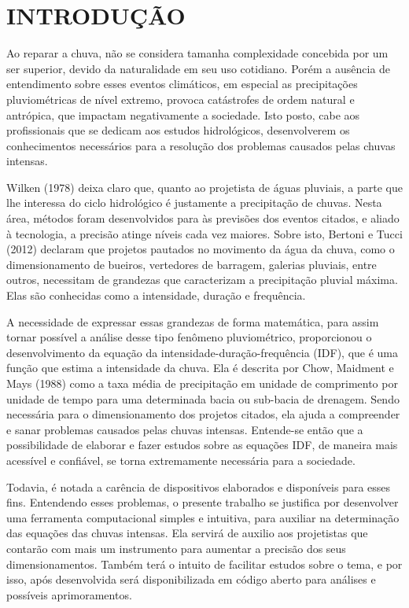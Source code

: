 \onehalfspacing
\chapter{INTRODUÇÃO}

Ao reparar a chuva, não se considera tamanha complexidade concebida por um ser superior, devido da naturalidade em seu uso cotidiano. Porém a ausência de entendimento sobre esses eventos climáticos, em especial as precipitações pluviométricas de nível extremo, provoca catástrofes de ordem natural e antrópica, que impactam negativamente a sociedade. Isto posto, cabe aos profissionais que se dedicam aos estudos hidrológicos, desenvolverem os conhecimentos necessários para a resolução dos problemas causados pelas chuvas intensas.

Wilken (1978) deixa claro que, quanto ao projetista de águas pluviais, a parte que lhe interessa do ciclo hidrológico é justamente a precipitação de chuvas. Nesta área, métodos foram desenvolvidos para às previsões dos eventos citados, e aliado à tecnologia, a precisão atinge níveis cada vez maiores. Sobre isto, Bertoni e Tucci (2012) declaram que projetos pautados no movimento da água da chuva, como o dimensionamento de bueiros, vertedores de barragem, galerias pluviais, entre outros, necessitam de grandezas que caracterizam a precipitação pluvial máxima. Elas são conhecidas como a intensidade, duração e frequência.

A necessidade de expressar essas grandezas de forma matemática, para assim tornar possível a análise desse tipo fenômeno pluviométrico, proporcionou o desenvolvimento da equação da intensidade-duração-frequência (IDF), que é uma função que estima a intensidade da chuva. Ela é descrita por Chow, Maidment e Mays (1988) como a taxa média de precipitação em unidade de comprimento por unidade de tempo para uma determinada bacia ou sub-bacia de drenagem. Sendo necessária para o dimensionamento dos projetos citados, ela ajuda a compreender e sanar problemas causados pelas chuvas intensas. Entende-se então que a possibilidade de elaborar e fazer estudos sobre as equações IDF, de maneira mais acessível e confiável, se torna extremamente necessária para a sociedade. 

Todavia, é notada a carência de dispositivos elaborados e disponíveis para esses fins. Entendendo esses problemas, o presente trabalho se justifica por desenvolver uma ferramenta computacional simples e intuitiva, para auxiliar na determinação das equações das chuvas intensas. Ela servirá de auxilio aos projetistas que contarão com mais um instrumento para aumentar a precisão dos seus dimensionamentos. Também terá o intuito de facilitar estudos sobre o tema, e por isso, após desenvolvida será disponibilizada em código aberto para análises e possíveis aprimoramentos.
 
